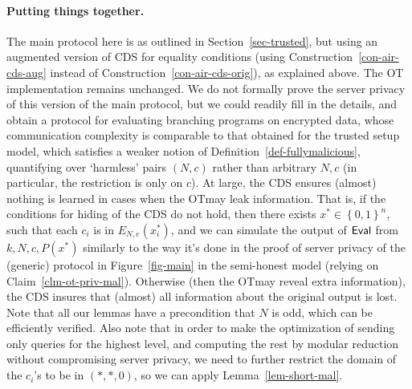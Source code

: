\documentclass[11pt]{article}
\newcommand{\encdj}{{E}_{N,e}}
\newcommand{\set}[1]{\left\{#1\right\}}
\newcommand{\bools}[1][]{{\set{0,1}}^{#1}}
\newcommand{\eval}{{\sf Eval}}
\newcommand{\ot}{\mbox{OT}\;}
\begin{document}
\paragraph{Putting things together.}
The main protocol here is as outlined in Section~\ref{sec-trusted}, but using an augmented version of CDS for equality conditions
(using Construction~\ref{con-air-cds-aug} instead of Construction~\ref{con-air-cds-orig}), as explained above. The OT implementation remains unchanged.
We do not formally prove the server privacy of this version of the main protocol, but we could readily fill in the details, and obtain a protocol
for evaluating branching programs on encrypted data, whose communication complexity is comparable
to that obtained for the trusted setup model, which satisfies a weaker notion of Definition~\ref{def-fullymalicious}, quantifying over `harmless' pairs $(N,c)$ rather than arbitrary $N,c$ (in particular, the restriction is only on $c$). At large, the CDS ensures (almost) nothing is learned in cases when the \ot may leak information.
That is, if the conditions for hiding of the CDS do not hold,
then there exists $x^*\in\bools[n]$, such that each $c_i$ is in $\encdj(x^*_i)$, and we can simulate
the output of $\eval$ from $k,N,c,P(x^*)$ similarly to the way it's done in the proof of server privacy of
the (generic) protocol in Figure~\ref{fig-main} in the semi-honest model
(relying on Claim~\ref{clm-ot-priv-mal}). Otherwise (then the \ot may reveal extra information), the CDS insures that (almost) all information about the original output is lost.
Note that all our lemmas have a precondition that $N$ is odd, which can be efficiently verified.
Also note that in order to make the optimization of sending only queries for the highest level, and computing the rest by modular reduction without compromising server privacy, we need to further restrict the domain of the $c_i$'s to be in $(*,*,0)$, so we can apply Lemma~\ref{lem-short-mal}.
\end{document}
